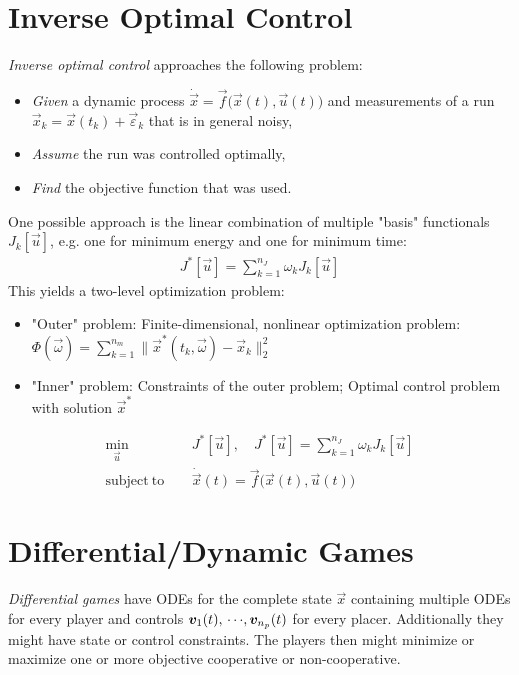 	\section{Inverse Optimal Control}
		\emph{Inverse optimal control} approaches the following problem:
		\begin{itemize}
			\item \emph{Given} a dynamic process \( \dot{\vec{x}} = \vec{f}\big(\vec{x}(t), \vec{u}(t)\big) \) and measurements of a run \( \vec{x}_k = \vec{x}(t_k) + \vec{\varepsilon}_k \) that is in general noisy,
			\item \emph{Assume} the run was controlled optimally,
			\item \emph{Find} the objective function that was used.
		\end{itemize}

		One possible approach is the linear combination of multiple "basis" functionals \( J_k[\vec{u}] \), e.g. one for minimum energy and one for minimum time:
		\begin{align*}
			J^\ast[\vec{u}] = \sum_{k = 1}^{n_J} \omega_k J_k[\vec{u}]
		\end{align*}
		This yields a two-level optimization problem:
		\begin{itemize}
			\item "Outer" problem: Finite-dimensional, nonlinear optimization problem: \( \Phi(\vec{\omega}) = \sum_{k = 1}^{n_m} \lVert \vec{x}^\ast(t_k, \vec{\omega}) - \vec{x}_k \rVert_2^2 \)
			\item "Inner" problem: Constraints of the outer problem; Optimal control problem with solution \( \vec{x}^\ast \)
		\end{itemize}
		\begin{align*}
			\min_{\vec{u}}           & \, J^\ast[\vec{u}],\quad J^\ast[\vec{u}] = \sum_{k = 1}^{n_J} \omega_k J_k[\vec{u}] \\
			\mathrm{subject~to}\quad & \,
			\dot{\vec{x}}(t) = \vec{f}\big(\vec{x}(t), \vec{u}(t)\big)
		\end{align*}

	\section{Differential/Dynamic Games}
		\emph{Differential games} have ODEs for the complete state \( \vec{x} \) containing multiple ODEs for every player and controls \( \bm{v}_1(t),\,\cdots\!,\bm{v}_{n_p}(t) \) for every placer. Additionally they might have state or control constraints. The players then might minimize or maximize one or more objective cooperative or non-cooperative.


